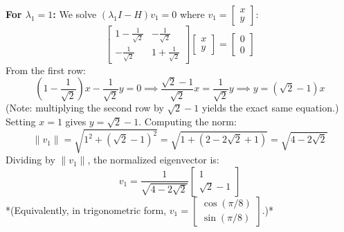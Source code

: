 \documentclass{article}
\begin{document}
\begin{enumerate}[(a)]
    \textbf{For $\lambda_1 = 1$:}
    We solve $(\lambda_1 I - H)v_1 = 0$ where $v_1 = \begin{bmatrix} x \\ y \end{bmatrix}$:
    \[
    \begin{bmatrix} 1 - \frac{1}{\sqrt{2}} & -\frac{1}{\sqrt{2}} \\ -\frac{1}{\sqrt{2}} & 1 + \frac{1}{\sqrt{2}} \end{bmatrix} \begin{bmatrix} x \\ y \end{bmatrix} = \begin{bmatrix} 0 \\ 0 \end{bmatrix}
    \]
    From the first row:
    \[
    \left(1 - \frac{1}{\sqrt{2}}\right)x - \frac{1}{\sqrt{2}}y = 0 \implies \frac{\sqrt{2} - 1}{\sqrt{2}}x = \frac{1}{\sqrt{2}}y \implies y = (\sqrt{2} - 1)x
    \]
    (Note: multiplying the second row by $\sqrt{2}-1$ yields the exact same equation.) Setting $x = 1$ gives $y = \sqrt{2} - 1$. Computing the norm:
    \[
    \|v_1\| = \sqrt{1^2 + (\sqrt{2} - 1)^2} = \sqrt{1 + (2 - 2\sqrt{2} + 1)} = \sqrt{4 - 2\sqrt{2}}
    \]
    Dividing by $\|v_1\|$, the normalized eigenvector is:
    \[
    v_1 = \frac{1}{\sqrt{4 - 2\sqrt{2}}} \begin{bmatrix} 1 \\ \sqrt{2} - 1 \end{bmatrix}
    \]
    *(Equivalently, in trigonometric form, $v_1 = \begin{bmatrix} \cos(\pi/8) \\ \sin(\pi/8) \end{bmatrix}$.)*


\end{enumerate}
\end{document}
